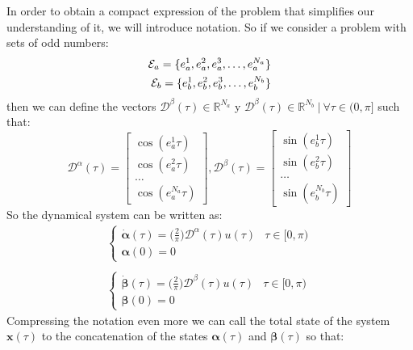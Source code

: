 In order to obtain a compact expression of the problem that simplifies our understanding of it, we will introduce notation.
%
So if we consider a problem with sets of odd numbers:
\begin{align}
    \mathcal{E}_a = \{e_a^1,e_a^2,e_a^3,\dots,e_a^{N_a}\} \notag
    \\
    \mathcal{E}_b = \{e_b^1,e_b^2,e_b^3,\dots,e_b^{N_b}\}    
\end{align}
%
then we can define the vectors $\bm{\mathcal{D}}^\beta(\tau) \in \mathbb{R}^{N_a} $ y $ \bm{\mathcal{D}}^\beta(\tau) \in \mathbb{R}^{N_b} \ | \ \forall \tau \in (0,\pi]$ such that:
\begin{equation}
    \bm{\mathcal{D}}^\alpha(\tau) = 
        \begin{bmatrix} 
        \cos(e_a^1\tau) \\
        \cos(e_a^2\tau) \\
        \dots           \\
        \cos(e_a^{N_a}\tau) 
    \end{bmatrix},
    \bm{\mathcal{D}}^\beta(\tau) = 
    \begin{bmatrix} 
    \sin(e_b^1\tau) \\
    \sin(e_b^2\tau) \\
    \dots           \\
    \sin(e_b^{N_b}\tau) 
    \end{bmatrix} 
\end{equation}
%
So the dynamical system can be written as:
\begin{equation}
    \begin{aligned}
        \begin{cases}
            \dot{\bm{\alpha}}(\tau) = \big(\frac{2}{\pi}\big)\bm{\mathcal{D}}^\alpha(\tau) u(\tau) & \tau \in [0,\pi)\\
            \bm{\alpha}(0) = 0
        \end{cases} \\ \\
        \begin{cases}
            \dot{\bm{\beta}}(\tau)  = \big(\frac{2}{\pi}\big)\bm{\mathcal{D}}^\beta(\tau) u(\tau) & \tau \in [0,\pi) \\
            \bm{\beta}(0) = 0
        \end{cases}
    \end{aligned}
\end{equation}
Compressing the notation even more we can call the total state of the system $ \bm {x} (\tau) $ to the concatenation of the states $ \bm {\alpha} (\tau) $ and $ \bm {\beta} ( \tau) $ so that:
